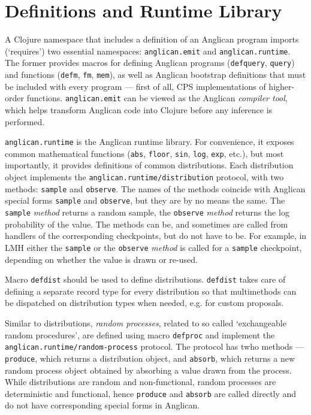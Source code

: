 \documentclass[preprint]{sigplanconf}
\begin{document}
\section{Definitions and Runtime Library}

A Clojure namespace that includes a definition of an Anglican
program imports (`requires') two essential namespaces:
\texttt{anglican.emit} and \texttt{anglican.runtime}. The former
provides macros for defining Anglican programs
(\texttt{defquery}, \texttt{query}) and functions
(\texttt{defm}, \texttt{fm}, \texttt{mem}), as well as Anglican
bootstrap definitions that must be included with every program
--- first of all, CPS implementations of higher-order functions.
\texttt{anglican.emit} can be viewed as the Anglican
\textit{compiler tool}, which helps transform Anglican code into
Clojure before any inference is performed.

\texttt{anglican.runtime} is the Anglican runtime library. For
convenience, it exposes common mathematical functions
(\texttt{abs}, \texttt{floor}, \texttt{sin}, \texttt{log},
\texttt{exp}, etc.), but most importantly, it provides
definitions of common distributions. Each distribution object
implements the \texttt{anglican.runtime/{\linebreak[0]}distribution} protocol,
with two methods: \texttt{sample} and \texttt{observe}. The
names of the methods coincide with Anglican special forms
\texttt{sample} and \texttt{observe}, but they are by no means
the same. The \texttt{sample} \textit{method} returns a random sample,
the \texttt{observe} \textit{method} returns the log probability
of the value. The methods can be, and sometimes are called from
handlers of the corresponding checkpoints, but do not have to
be. For example, in LMH either the \texttt{sample} or
the \texttt{observe} \textit{method} is called for a
\texttt{sample} checkpoint, depending on whether the value is
drawn or re-used. 

Macro \texttt{defdist} should be used to define distributions.
\texttt{defdist} takes care of defining a separate record type
for every distribution so that multimethods can be dispatched on
distribution types when needed, e.g. for custom proposals.

Similar to distributions, \textit{random processes}, related to
so called `exchangeable random procedures', are defined using
macro \texttt{defproc} and implement the
\texttt{anglican.runtime/{\linebreak[0]}random-process} protocol. The protocol
has twho methods --- \texttt{produce}, which returns a
distribution object, and \texttt{absorb}, which returns a new
random process object obtained by absorbing a value drawn from
the process. While distributions are random and non-functional,
random processes are deterministic and functional, hence
\texttt{produce} and \texttt{absorb} are called directly and do
not have corresponding special forms in Anglican.

\acks



\end{document}
